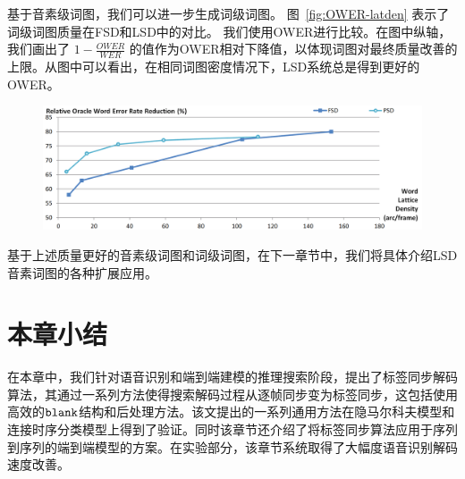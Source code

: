
基于音素级词图，我们可以进一步生成词级词图。 图~\ref{fig:OWER-latden} 表示了词级词图质量在FSD和LSD中的对比。
我们使用OWER进行比较。在图中纵轴，我们画出了 $1-\frac{OWER}{WER}$ 的值作为OWER相对下降值，以体现词图对最终质量改善的上限。从图中可以看出，在相同词图密度情况下，LSD系统总是得到更好的OWER。


\begin{figure}[!htp]
  \centering
    \captionstyle{\centering}
    \includegraphics[width=\textwidth]{figure/OWER-latden.png}
\end{figure}

基于上述质量更好的音素级词图和词级词图，在下一章节中，我们将具体介绍LSD音素词图的各种扩展应用。

\section{本章小结}
\label{chap:lsd-sum}

在本章中，我们针对语音识别和端到端建模的推理搜索阶段，提出了标签同步解码算法，其通过一系列方法使得搜索解码过程从逐帧同步变为标签同步，这包括使用高效的$\tt blank$结构和后处理方法。该文提出的一系列通用方法在隐马尔科夫模型和连接时序分类模型上得到了验证。同时该章节还介绍了将标签同步算法应用于序列到序列的端到端模型的方案。在实验部分，该章节系统取得了大幅度语音识别解码速度改善。
